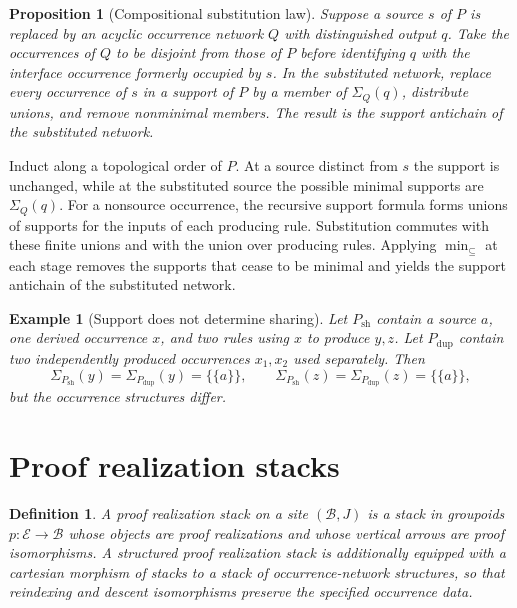 \documentclass[12pt,a4paper,twoside]{extarticle}
\makeatletter
\theoremstyle{compactplain}
\newtheorem{proposition}[theorem]{Proposition}
\theoremstyle{compactdef}
\newtheorem{definition}[theorem]{Definition}
\newtheorem{example}[theorem]{Example}
\renewenvironment{proof}[1][\proofname]{\par\pushQED{\qed}\normalfont
  \topsep2pt\trivlist\item[\hskip\labelsep\bfseries #1\@addpunct{.}]\ignorespaces}
 {\popQED\endtrivlist\@endpefalse}
\makeatother
\begin{document}
\begin{proposition}[Compositional substitution law]
Suppose a source $s$ of $P$ is replaced by an acyclic occurrence network $Q$ with distinguished output $q$.  Take the occurrences of $Q$ to be disjoint from those of $P$ before identifying $q$ with the interface occurrence formerly occupied by $s$.  In the substituted network, replace every occurrence of $s$ in a support of $P$ by a member of $\Sigma_Q(q)$, distribute unions, and remove nonminimal members.  The result is the support antichain of the substituted network.
\end{proposition}
\begin{proof}
Induct along a topological order of $P$.  At a source distinct from $s$ the support is unchanged, while at the substituted source the possible minimal supports are $\Sigma_Q(q)$.  For a nonsource occurrence, the recursive support formula forms unions of supports for the inputs of each producing rule.  Substitution commutes with these finite unions and with the union over producing rules.  Applying $\min_{\subseteq}$ at each stage removes the supports that cease to be minimal and yields the support antichain of the substituted network.
\end{proof}

\begin{example}[Support does not determine sharing]
Let $P_{\mathrm{sh}}$ contain a source $a$, one derived occurrence $x$, and two rules using $x$ to produce $y,z$. Let $P_{\mathrm{dup}}$ contain two independently produced occurrences $x_1,x_2$ used separately. Then
\[
\Sigma_{P_{\mathrm{sh}}}(y)=\Sigma_{P_{\mathrm{dup}}}(y)=\{\{a\}\},\qquad
\Sigma_{P_{\mathrm{sh}}}(z)=\Sigma_{P_{\mathrm{dup}}}(z)=\{\{a\}\},
\]
but the occurrence structures differ.
\end{example}
\section{Proof realization stacks}

\begin{definition}
A proof realization stack on a site $(\mathcal B,J)$ is a stack in groupoids $p:\mathcal E\to\mathcal B$ whose objects are proof realizations and whose vertical arrows are proof isomorphisms. A structured proof realization stack is additionally equipped with a cartesian morphism of stacks to a stack of occurrence-network structures, so that reindexing and descent isomorphisms preserve the specified occurrence data.
\end{definition}
\end{document}
